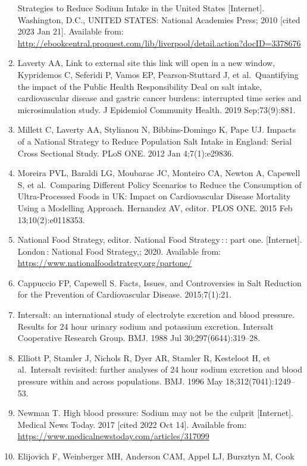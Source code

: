 \documentclass[
]{article}
\begin{document}
\begin{enumerate}
  Strategies to Reduce Sodium Intake in the United States
  {[}Internet{]}. Washington, D.C., UNITED STATES: National Academies
  Press; 2010 {[}cited 2023 Jan 21{]}. Available from:
  \url{http://ebookcentral.proquest.com/lib/liverpool/detail.action?docID=3378676}
\item
  Laverty AA, Link to external site this link will open in a new window,
  Kypridemos C, Seferidi P, Vamos EP, Pearson-Stuttard J, et
  al.~Quantifying the impact of the Public Health Responsibility Deal on
  salt intake, cardiovascular disease and gastric cancer burdens:
  interrupted time series and microsimulation study. J Epidemiol
  Community Health. 2019 Sep;73(9):881.
\item
  Millett C, Laverty AA, Stylianou N, Bibbins-Domingo K, Pape UJ.
  Impacts of a National Strategy to Reduce Population Salt Intake in
  England: Serial Cross Sectional Study. PLoS ONE. 2012 Jan
  4;7(1):e29836.
\item
  Moreira PVL, Baraldi LG, Moubarac JC, Monteiro CA, Newton A, Capewell
  S, et al.~Comparing Different Policy Scenarios to Reduce the
  Consumption of Ultra-Processed Foods in UK: Impact on Cardiovascular
  Disease Mortality Using a Modelling Approach. Hernandez AV, editor.
  PLOS ONE. 2015 Feb 13;10(2):e0118353.
\item
  National Food Strategy, editor. National Food Strategy\,:\,: part one.
  {[}Internet{]}. London\,: National Food Strategy,; 2020. Available
  from: \url{https://www.nationalfoodstrategy.org/partone/}
\item
  Cappuccio FP, Capewell S. Facts, Issues, and Controversies in Salt
  Reduction for the Prevention of Cardiovascular Disease. 2015;7(1):21.
\item
  Intersalt: an international study of electrolyte excretion and blood
  pressure. Results for 24 hour urinary sodium and potassium excretion.
  Intersalt Cooperative Research Group. BMJ. 1988 Jul
  30;297(6644):319--28.
\item
  Elliott P, Stamler J, Nichols R, Dyer AR, Stamler R, Kesteloot H, et
  al.~Intersalt revisited: further analyses of 24 hour sodium excretion
  and blood pressure within and across populations. BMJ. 1996 May
  18;312(7041):1249--53.
\item
  Newman T. High blood pressure: Sodium may not be the culprit
  {[}Internet{]}. Medical News Today. 2017 {[}cited 2022 Oct 14{]}.
  Available from: \url{https://www.medicalnewstoday.com/articles/317099}
\item
  Elijovich F, Weinberger MH, Anderson CAM, Appel LJ, Bursztyn M, Cook

\end{enumerate}
\end{document}
